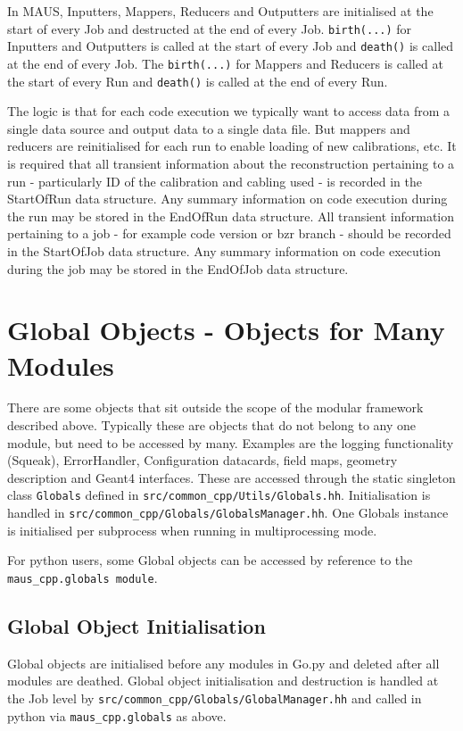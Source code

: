 In MAUS, Inputters, Mappers, Reducers and Outputters are initialised at the start of every Job and destructed at the end of every Job. \verb|birth(...)| for Inputters and Outputters is called at the start of every Job and \verb|death()| is called at the end of every Job. The \verb|birth(...)| for Mappers and Reducers is called at the start of every Run and \verb|death()| is called at the end of every Run.

The logic is that for each code execution we typically want to access data from a single data source and output data to a single data file. But mappers and reducers are reinitialised for each run to enable loading of new calibrations, etc. It is required that all transient information about the reconstruction pertaining to a run - particularly ID of the calibration and cabling used - is recorded in the StartOfRun data structure. Any summary information on code execution during the run may be stored in the EndOfRun data structure. All transient information pertaining to a job - for example code version or bzr branch - should be recorded in the StartOfJob data structure. Any summary information on code execution during the job may be stored in the EndOfJob data structure.

\section{Global Objects - Objects for Many Modules}
There are some objects that sit outside the scope of the modular framework described above. Typically these are objects that do not belong to any one module, but need to be accessed by many. Examples are the logging functionality (Squeak), ErrorHandler, Configuration datacards, field maps, geometry description and Geant4 interfaces. These are accessed through the static singleton class \verb|Globals| defined in \verb|src/common_cpp/Utils/Globals.hh|. Initialisation is handled in \verb|src/common_cpp/Globals/GlobalsManager.hh|. One Globals instance is initialised per subprocess when running in multiprocessing mode.

For python users, some Global objects can be accessed by reference to the \verb|maus_cpp.globals module|.

\subsection{Global Object Initialisation}
Global objects are initialised before any modules in Go.py and deleted after all modules are deathed. Global object initialisation and destruction is handled at the Job level by \verb|src/common_cpp/Globals/GlobalManager.hh| and called in python via \verb|maus_cpp.globals| as above.


